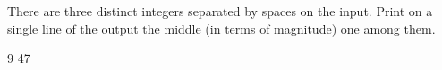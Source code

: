 




There are three distinct integers separated by spaces on the input. Print on a single line of the output the middle (in terms of magnitude) one among them.

 9 47
\koniec

